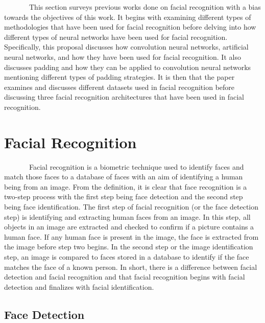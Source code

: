 \documentclass[
  12pt,
]{report}
\begin{document}
~~~~~~~This section surveys previous works done on facial recognition
with a bias towards the objectives of this work. It begins with
examining different types of methodologies that have been used for
facial recognition before delving into how different types of neural
networks have been used for facial recognition. Specifically, this
proposal discusses how convolution neural networks, artificial neural
networks, and how they have been used for facial recognition. It also
discusses padding and how they can be applied to convolution neural
networks mentioning different types of padding strategies. It is then
that the paper examines and discusses different datasets used in facial
recognition before discussing three facial recognition architectures
that have been used in facial recognition.

\section{Facial Recognition}\label{facial-recognition}

~~~~~~~Facial recognition is a biometric technique used to identify
faces and match those faces to a database of faces with an aim of
identifying a human being from an image. From the definition, it is
clear that face recognition is a two-step process with the first step
being face detection and the second step being face identification. The
first step of facial recognition (or the face detection step) is
identifying and extracting human faces from an image. In this step, all
objects in an image are extracted and checked to confirm if a picture
contains a human face. If any human face is present in the image, the
face is extracted from the image before step two begins. In the second
step or the image identification step, an image is compared to faces
stored in a database to identify if the face matches the face of a known
person. In short, there is a difference between facial detection and
facial recognition and that facial recognition begins with facial
detection and finalizes with facial identification.

\subsection{Face Detection}\label{face-detection}
\end{document}
